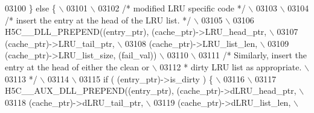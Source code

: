 \begin{DoxyCode}
03100 \textcolor{preprocessor}{    \} else \{                                                               \(\backslash\)}
03101 \textcolor{preprocessor}{                                                                           \(\backslash\)}
03102 \textcolor{preprocessor}{        }\textcolor{comment}{/* modified LRU specific code */}\textcolor{preprocessor}{                                   \(\backslash\)}
03103 \textcolor{preprocessor}{                                                                           \(\backslash\)}
03104 \textcolor{preprocessor}{        }\textcolor{comment}{/* insert the entry at the head of the LRU list. */}\textcolor{preprocessor}{                \(\backslash\)}
03105 \textcolor{preprocessor}{                                                                           \(\backslash\)}
03106 \textcolor{preprocessor}{        H5C\_\_DLL\_PREPEND((entry\_ptr), (cache\_ptr)->LRU\_head\_ptr,           \(\backslash\)}
03107 \textcolor{preprocessor}{                         (cache\_ptr)->LRU\_tail\_ptr,                        \(\backslash\)}
03108 \textcolor{preprocessor}{                         (cache\_ptr)->LRU\_list\_len,                        \(\backslash\)}
03109 \textcolor{preprocessor}{                         (cache\_ptr)->LRU\_list\_size, (fail\_val))           \(\backslash\)}
03110 \textcolor{preprocessor}{                                                                           \(\backslash\)}
03111 \textcolor{preprocessor}{        }\textcolor{comment}{/* Similarly, insert the entry at the head of either the clean or  \(\backslash\)}
03112 \textcolor{comment}{         * dirty LRU list as appropriate.                                  \(\backslash\)}
03113 \textcolor{comment}{         */}\textcolor{preprocessor}{                                                                \(\backslash\)}
03114 \textcolor{preprocessor}{                                                                           \(\backslash\)}
03115 \textcolor{preprocessor}{        if ( (entry\_ptr)->is\_dirty ) \{                                     \(\backslash\)}
03116 \textcolor{preprocessor}{                                                                           \(\backslash\)}
03117 \textcolor{preprocessor}{            H5C\_\_AUX\_DLL\_PREPEND((entry\_ptr), (cache\_ptr)->dLRU\_head\_ptr,  \(\backslash\)}
03118 \textcolor{preprocessor}{                                 (cache\_ptr)->dLRU\_tail\_ptr,               \(\backslash\)}
03119 \textcolor{preprocessor}{                                 (cache\_ptr)->dLRU\_list\_len,               \(\backslash\)}

\end{DoxyCode}
